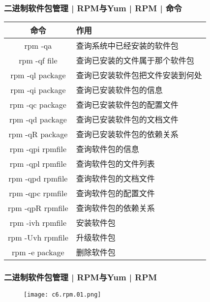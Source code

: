 \begin{frame}
  \frametitle{二进制软件包管理 | RPM与Yum | RPM | \alert{命令}}
  \begin{table}
    \centering
    \begin{tabularx}{\textwidth}{cX}
      \hline
      \rowcolor{blue!50}命令 & 作用\\
      \hline
      rpm -qa & 查询系统中已经安装的软件包\\
      rpm -qf file & 查询已安装的文件属于那个软件包\\
      rpm -ql package & 查询已安装软件包把文件安装到何处\\
      rpm -qi package & 查询已安装软件包的信息\\
      rpm -qc package & 查询已安装软件包的配置文件\\
      rpm -qd package & 查询已安装软件包的文档文件\\
      rpm -qR package & 查询已安装软件包的依赖关系\\
      \hline
      rpm -qpi rpmfile & 查询软件包的信息\\
      rpm -qpl rpmfile & 查询软件包的文件列表\\
      rpm -qpd rpmfile & 查询软件包的文档文件\\
      rpm -qpc rpmfile & 查询软件包的配置文件\\
      rpm -qpR rpmfile & 查询软件包的依赖关系\\
      \hline
      rpm -ivh rpmfile & 安装软件包\\
      rpm -Uvh rpmfile & 升级软件包\\
      rpm -e package & 删除软件包\\
      \hline
    \end{tabularx}
  \end{table}
\end{frame}

\begin{frame}
  \frametitle{二进制软件包管理 | RPM与Yum | RPM}
  \begin{figure}
    \centering
    \texttt{[image: c6.rpm.01.png]}
  \end{figure}
\end{frame}

